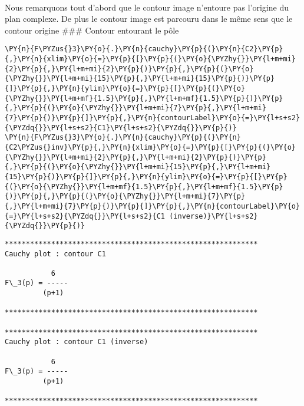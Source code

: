     \begin{center}
    \end{center}
    { \hspace*{\fill} \\}
    
    Nous remarquons tout d'abord que le contour image n'entoure pas
l'origine du plan complexe. De plus le contour image est parcouru dans
le même sens que le contour origine \#\#\# Contour entourant le pôle

    \begin{tcolorbox}[breakable, size=fbox, boxrule=1pt, pad at break*=1mm,colback=cellbackground, colframe=cellborder]
\begin{Verbatim}[commandchars=\\\{\}]
\PY{n}{F\PYZus{}3}\PY{o}{.}\PY{n}{cauchy}\PY{p}{(}\PY{n}{C2}\PY{p}{,}\PY{n}{xlim}\PY{o}{=}\PY{p}{[}\PY{p}{(}\PY{o}{\PYZhy{}}\PY{l+m+mi}{2}\PY{p}{,}\PY{l+m+mi}{2}\PY{p}{)}\PY{p}{,}\PY{p}{(}\PY{o}{\PYZhy{}}\PY{l+m+mi}{15}\PY{p}{,}\PY{l+m+mi}{15}\PY{p}{)}\PY{p}{]}\PY{p}{,}\PY{n}{ylim}\PY{o}{=}\PY{p}{[}\PY{p}{(}\PY{o}{\PYZhy{}}\PY{l+m+mf}{1.5}\PY{p}{,}\PY{l+m+mf}{1.5}\PY{p}{)}\PY{p}{,}\PY{p}{(}\PY{o}{\PYZhy{}}\PY{l+m+mi}{7}\PY{p}{,}\PY{l+m+mi}{7}\PY{p}{)}\PY{p}{]}\PY{p}{,}\PY{n}{contourLabel}\PY{o}{=}\PY{l+s+s2}{\PYZdq{}}\PY{l+s+s2}{C1}\PY{l+s+s2}{\PYZdq{}}\PY{p}{)}
\PY{n}{F\PYZus{}3}\PY{o}{.}\PY{n}{cauchy}\PY{p}{(}\PY{n}{C2\PYZus{}inv}\PY{p}{,}\PY{n}{xlim}\PY{o}{=}\PY{p}{[}\PY{p}{(}\PY{o}{\PYZhy{}}\PY{l+m+mi}{2}\PY{p}{,}\PY{l+m+mi}{2}\PY{p}{)}\PY{p}{,}\PY{p}{(}\PY{o}{\PYZhy{}}\PY{l+m+mi}{15}\PY{p}{,}\PY{l+m+mi}{15}\PY{p}{)}\PY{p}{]}\PY{p}{,}\PY{n}{ylim}\PY{o}{=}\PY{p}{[}\PY{p}{(}\PY{o}{\PYZhy{}}\PY{l+m+mf}{1.5}\PY{p}{,}\PY{l+m+mf}{1.5}\PY{p}{)}\PY{p}{,}\PY{p}{(}\PY{o}{\PYZhy{}}\PY{l+m+mi}{7}\PY{p}{,}\PY{l+m+mi}{7}\PY{p}{)}\PY{p}{]}\PY{p}{,}\PY{n}{contourLabel}\PY{o}{=}\PY{l+s+s2}{\PYZdq{}}\PY{l+s+s2}{C1 (inverse)}\PY{l+s+s2}{\PYZdq{}}\PY{p}{)}
\end{Verbatim}
\end{tcolorbox}

    \begin{Verbatim}[commandchars=\\\{\}]
************************************************************
Cauchy plot : contour C1

           6
F\_3(p) = -----
         (p+1)

************************************************************

************************************************************
Cauchy plot : contour C1 (inverse)

           6
F\_3(p) = -----
         (p+1)

************************************************************

    \end{Verbatim}

